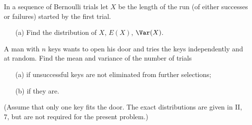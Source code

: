\begin{problem}[Handout 7, \# 16]
  In a sequence of Bernoulli trials let \(X\) be the length of the run (of
  either successes or failures) started by the first trial.
  \begin{itemize}[noitemsep]
  \item[(a)] Find the distribution of \(X\), \(E(X)\), \(\Var(X)\).
  \end{itemize}
\end{problem}
\begin{solution}

\end{solution}
\newpage

\begin{problem}[Handout 7, \# 17]
  A man with \(n\) keys wants to open his door and tries the keys
  independently and at random. Find the mean and variance of the number of
  trials
  \begin{itemize}[noitemsep]
  \item[(a)] if unsuccessful keys are not eliminated from further
    selections;
  \item[(b)] if they are.
  \end{itemize}
  (Assume that only one key fits the door. The exact distributions are
  given in II, 7, but are not required for the present problem.)
\end{problem}
\begin{solution}

\end{solution}

